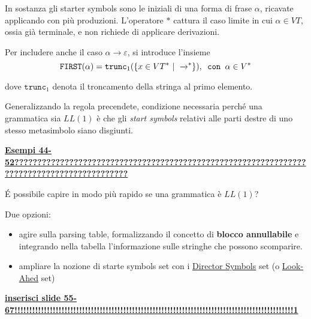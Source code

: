 In sostanza gli starter symbols sono le iniziali di una forma di frase $\alpha$, ricavate applicando con più produzioni.
L'operatore $*$ cattura il caso limite in cui $\alpha \in VT$, ossia già terminale, e non richiede di applicare derivazioni.

Per includere anche il caso $\alpha \rightarrow \varepsilon$, si introduce l'insieme
\begin{equation*}
\texttt{FIRST}(\alpha ) = \texttt{trunc}_1(\{x \in VT^*\ |\ \xrightarrow{}\mathrel{\vphantom{\to}^*}\}), \texttt{ con } \alpha \in V^*
\end{equation*}

dove $\texttt{trunc}_1$ denota il troncamento della stringa al primo elemento.

Generalizzando la regola precendete, condizione necessaria perché una grammatica sia $LL(1)$ è che gli \textit{start symbols} relativi alle parti destre di uno stesso metasimbolo siano disgiunti.

\textbf{\underline{Esempi 44-52???????????????????????????????????????????????????????????????????????????????????????????}} 

É possibile capire in modo più rapido se una grammatica è $LL(1)$?

Due opzioni:
\begin{itemize}
    \item agire sulla parsing table, formalizzando il concetto di \textbf{blocco annullabile} e integrando nella tabella l'informazione sulle stringhe che possono scomparire.
    \item ampliare la nozione di starte symbols set con i \underline{Director Symbols} set (o \underline{Look-Ahed} set)
\end{itemize}

\underline{\textbf{inserisci slide 55-67!!!!!!!!!!!!!!!!!!!!!!!!!!!!!!!!!!!!!!!!!!!!!!!!!!!!!!!!!!!!!!!!!!!!!!!!!!!!!!!!!!!!!!!!!!!!!!!1}}  













